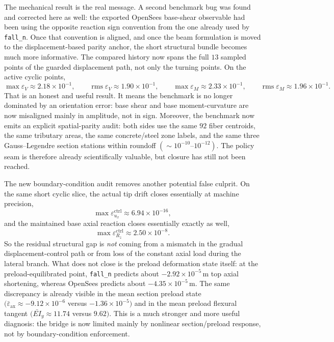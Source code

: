 The mechanical result is the real message. A second benchmark bug was found and
corrected here as well: the exported OpenSees base-shear observable had been
using the opposite reaction sign convention from the one already used by
\texttt{fall\_n}. Once that convention is aligned, and once the beam
formulation is moved to the displacement-based parity anchor, the short
structural bundle becomes much more informative.  The compared history now
spans the full \(13\) sampled points of the guarded displacement path, not
only the turning points. On the active cyclic points,
\[
\max \varepsilon_{V} \approx 2.18\times 10^{-1},\qquad
\operatorname{rms}\varepsilon_{V} \approx 1.90\times 10^{-1},\qquad
\max \varepsilon_{M} \approx 2.33\times 10^{-1},\qquad
\operatorname{rms}\varepsilon_{M} \approx 1.96\times 10^{-1}.
\]
That is an honest and useful result. It means the benchmark is no longer
dominated by an orientation error: base shear and base moment-curvature are now
misaligned mainly in amplitude, not in sign. Moreover, the benchmark now emits
an explicit spatial-parity audit: both sides use the same \(92\) fiber
centroids, the same tributary areas, the same concrete/steel zone labels, and
the same three Gauss--Legendre section stations within roundoff
\((\sim10^{-10}\text{--}10^{-12})\).  The policy seam is therefore already
scientifically valuable, but closure has still not been reached.

The new boundary-condition audit removes another potential false culprit.  On
the same short cyclic slice, the actual tip drift closes essentially at machine
precision,
\[
\max \varepsilon_{u_x}^{\text{ctrl}} \approx 6.94\times10^{-16},
\]
and the maintained base axial reaction closes essentially exactly as well,
\[
\max \varepsilon_{R_z}^{\text{ctrl}} \approx 2.50\times10^{-8}.
\]
So the residual structural gap is \emph{not} coming from a mismatch in the
gradual displacement-control path or from loss of the constant axial load
during the lateral branch.  What does not close is the preload deformation
state itself: at the preload-equilibrated point, \texttt{fall\_n} predicts
about \(-2.92\times10^{-5}\,\text{m}\) top axial shortening, whereas OpenSees
predicts about \(-4.35\times10^{-5}\,\text{m}\).  The same discrepancy is
already visible in the mean section preload state
\((\bar{\varepsilon}_{\text{ax}} \approx -9.12\times10^{-6}\) versus
\(-1.36\times10^{-5})\) and in the mean preload flexural tangent
\((\bar{EI}_y \approx 11.74\) versus \(9.62)\).  This is a much stronger and
more useful diagnosis: the bridge is now limited mainly by nonlinear
section/preload response, not by boundary-condition enforcement.


